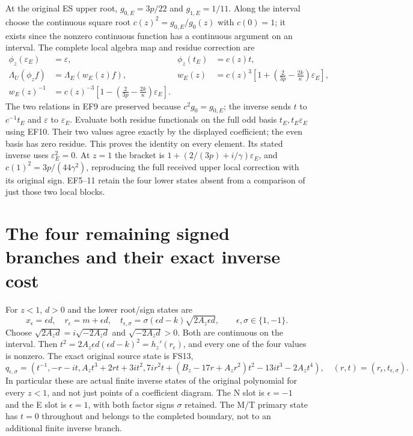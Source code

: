 At the original ES upper root, $g_{0,E}=3p/22$ and
$g_{1,E}=1/11$. Along the interval choose the continuous
square root $c(z)^2=g_{0,E}/g_0(z)$ with $c(0)=1$;
it exists since the nonzero continuous function has a
continuous argument on an interval. The complete local
algebra map and residue correction are
\begin{equation}
\begin{aligned}
 \phi_z(\varepsilon_E)&=\varepsilon,&\phi_z(t_E)&=c(z)t,\\
 \Lambda_U(\phi_z f)&=\Lambda_E(w_E(z)f),&
 w_E(z)&=c(z)^3\left[1+
       \left(\frac2{3p}-\frac{2k}{\kappa}\right)\varepsilon_E\right],\\
 w_E(z)^{-1}&=c(z)^{-3}\left[1-
       \left(\frac2{3p}-\frac{2k}{\kappa}\right)\varepsilon_E\right].
\end{aligned}\tag{EF12}
\end{equation}
The two relations in EF9 are preserved because
$c^2g_0=g_{0,E}$; the inverse sends $t$ to $c^{-1}t_E$
and $\varepsilon$ to $\varepsilon_E$. Evaluate both
residue functionals on the full odd basis
$t_E,t_E\varepsilon_E$ using EF10. Their two values
agree exactly by the displayed coefficient; the even
basis has zero residue. This proves the identity on
every element. Its stated inverse uses
$\varepsilon_E^2=0$. At $z=1$ the bracket is
$1+(2/(3p)+i/\gamma)\varepsilon_E$, and
$c(1)^2=3p/(44\gamma^2)$, reproducing the full
received upper local correction with its original sign.
EF5--11 retain the four lower states absent from a
comparison of just those two local blocks.

\section{The four remaining signed branches and their exact inverse cost}
For $z<1$, $d>0$ and the lower root/sign states are
\begin{equation}
 x_\epsilon=\epsilon d,\quad r_\epsilon=m+\epsilon d,\quad
 t_{\epsilon,\sigma}=\sigma(\epsilon d-k)\sqrt{2A_z\epsilon d},
 \qquad\epsilon,\sigma\in\{1,-1\}.
 \tag{EF13}
\end{equation}
Choose $\sqrt{2A_zd}=i\sqrt{-2A_zd}$ and
$\sqrt{-2A_zd}>0$. Both are continuous on the interval.
Then $t^2=2A_z\epsilon d(\epsilon d-k)^2=h_z'(r_\epsilon)$,
and every one of the four values is nonzero.
The exact original source state is FS13,
\begin{equation}
 q_{\epsilon,\sigma}=
 \left(t^{-1},-r-it,A_zt^3+2rt+3it^2,
 7ir^2t+(B_z-17r+A_zr^2)t^2-13it^3-2A_zt^4\right),
 \quad(r,t)=(r_\epsilon,t_{\epsilon,\sigma}).
 \tag{EF14}
\end{equation}
In particular these are actual finite inverse states of
the original polynomial for every $z<1$, and not just
points of a coefficient diagram. The N slot is
$\epsilon=-1$ and the E slot is $\epsilon=1$, with
both factor signs $\sigma$ retained. The M/T primary
state has $t=0$ throughout and belongs to the completed
boundary, not to an additional finite inverse branch.

